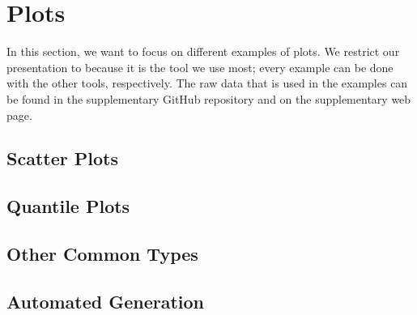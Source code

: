 \section{Plots}

In this section, we want to focus on different examples of plots.  We restrict
our presentation to  because it is the tool we use most;
every example can be done with the other tools, respectively.  The raw data that
is used in the examples can be found in the supplementary GitHub
repository and on the supplementary web
page.

\subsection{Scatter Plots}

\subsection{Quantile Plots}

\subsection{Other Common Types}

\subsection{Automated Generation}

